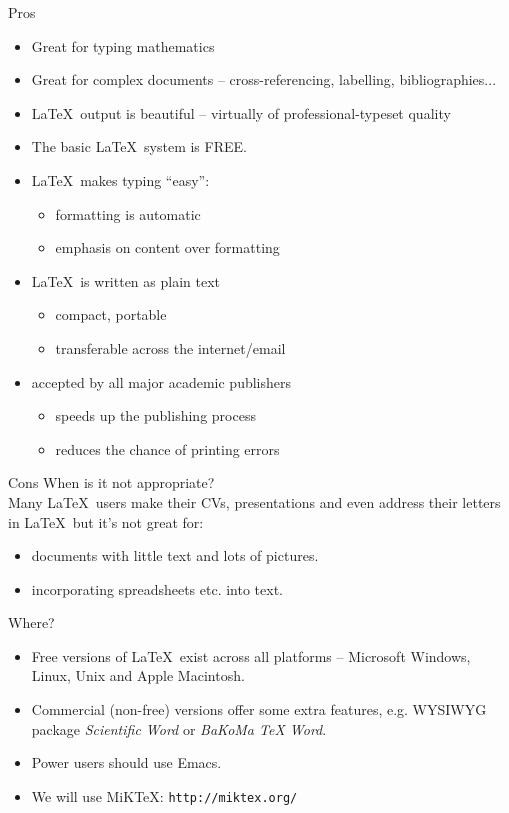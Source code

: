 \documentclass[handout]{beamer}
\begin{document}
\begin{frame}{Pros}
\begin{itemize}
\item Great for typing mathematics
\item Great for complex documents  -- cross-referencing, labelling, bibliographies...
\item \LaTeX\ output is beautiful -- virtually of professional-typeset quality
\item The basic \LaTeX\ system is FREE.
\item \LaTeX\ makes typing ``easy'':
\begin{itemize}
\item formatting is automatic 
\item emphasis on content over formatting
\end{itemize}
\item \LaTeX\ is written as plain text 
\begin{itemize}
\item compact, portable
\item transferable across the internet/email
\end{itemize}
\item accepted by all major academic publishers 
\begin{itemize}
\item speeds up the publishing process
\item reduces the chance of printing errors
\end{itemize}
\end{itemize}
\end{frame}

\begin{frame}{Cons}
When is it not appropriate?\\[0.5cm] Many \LaTeX\ users make their CVs, presentations and even address their letters in \LaTeX\ but it's not great for:
\begin{itemize}
\item documents with little text and lots of pictures.
\item incorporating spreadsheets etc. into text.
\end{itemize}
\end{frame}


\begin{frame}{Where?}
\begin{itemize}
\item Free versions of \LaTeX\ exist across all platforms -- Microsoft Windows, Linux, Unix and Apple Macintosh. 
\item Commercial (non-free) versions offer some extra features, e.g. WYSIWYG package \emph{Scientific Word} or {\em BaKoMa TeX Word}. 
\item Power users should use Emacs.
\item We will use MiK\TeX: {\tt http://miktex.org/}
\end{itemize}
\end{frame}
\end{document}
